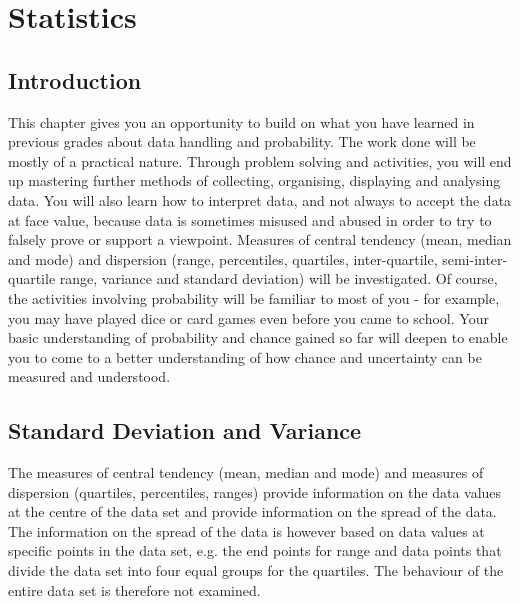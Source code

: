 \chapter{Statistics}
\label{m:s11}

\section{Introduction}
This chapter gives you an opportunity to build on what you have learned in previous grades about data handling and probability. The work done will be mostly  of a practical nature. Through problem solving and activities, you will end up mastering further methods of collecting, organising, displaying and analysing data. You will also learn how to interpret data, and not always to accept the data at face value, because data is sometimes misused and abused in order to try to falsely prove or support a viewpoint. Measures of central tendency (mean, median and mode) and dispersion (range, percentiles, quartiles, inter-quartile, semi-inter-quartile range, variance and standard deviation) will be investigated. Of course, the activities involving probability will be familiar to most of you - for example, you may have played dice or card games even before you came to school. Your basic understanding of probability and chance gained so far will deepen to enable you to come to a better understanding of how chance and uncertainty can be measured and understood.  


\section{Standard Deviation and Variance}

The measures of central tendency (mean, median and mode) and measures of dispersion (quartiles, percentiles, ranges) provide information on the data values at the centre of the data set and provide information on the spread of the data. The information on the spread of the data is however based on data values at specific points in the data set, e.g.\@{} the end points for range and data points that divide the data set into four equal groups for the quartiles. The behaviour of the entire data set is therefore not examined.

